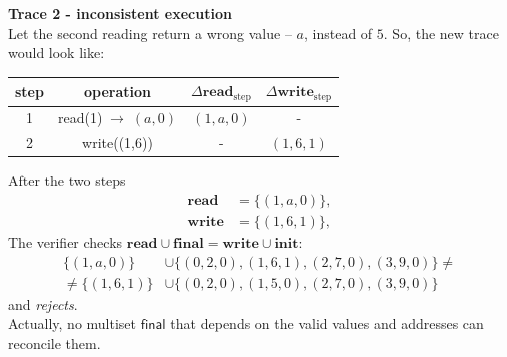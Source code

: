 \documentclass[../../book]{subfiles}
\begin{document}
\begin{example}
\medskip
\noindent\textbf{Trace 2 - inconsistent execution}\\
Let the second reading return a wrong value -- $a$, instead of $5$. So, the new trace would look like:
\begin{center}
    \begin{tabular}{c|c|c|c}
    \textbf{step} & \textbf{operation} & $\Delta\mathbf{read}_{\text{step}}$ & $\Delta\mathbf{write}_{\text{step}}$\\\hline
    1 & read(1)$  \; \to \; (a, 0)$ & $(1,a,0)$ & -        \\
    2 & write((1,6))                & -         & $(1,6,1)$\\
    \end{tabular}
\end{center}
After the two steps
\begin{equation*}
    \begin{aligned}
        \mathbf{read} &= \{(1,a,0)\},\\
        \mathbf{write} &= \{(1,6,1)\},
    \end{aligned}
\end{equation*}
The verifier checks $\mathbf{read} \cup \mathbf{final} = \mathbf{write} \cup \mathbf{init}$:
\begin{align*}
    \{(1,a,0)\} &\cup \{(0,2,0), (1,6,1), (2,7,0), (3,9,0)\} \neq \\
    \neq \{(1,6,1)\} &\cup \{(0,2,0), (1,5,0), (2,7,0), (3,9,0)\}
\end{align*}
and \emph{rejects}.\\

Actually, no multiset $\mathsf{final}$ that depends on the valid values and addresses can 
reconcile them.
\end{example}
\end{document}
